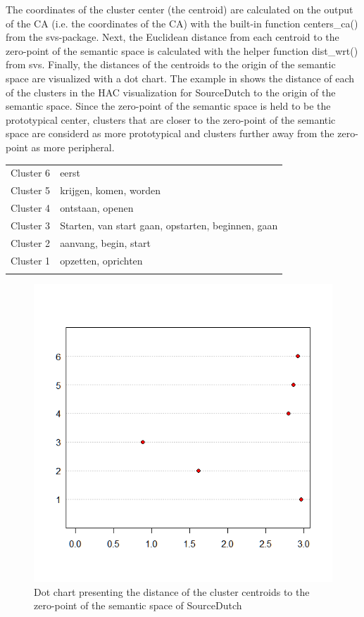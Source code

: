 The coordinates of the cluster center (the centroid) are calculated on the output of the CA (i.e. the coordinates of the CA) with the built-in function centers\_ca() from the svs{}-package. Next, the Euclidean distance from each centroid to the zero-point of the semantic space is calculated with the helper function dist\_wrt() from svs. Finally, the distances of the centroids to the origin of the semantic space are visualized with a dot chart. The example in  shows the distance of each of the clusters in the HAC visualization for SourceDutch to the origin of the semantic space. Since the zero-point of the semantic space is held to be the prototypical center, clusters that are closer to the zero-point of the semantic space are considerd as more prototypical and clusters further away from the zero-point as more peripheral. 


\begin{tabular}{ll}
\lsptoprule
Cluster 6 & eerst\\
Cluster 5 & krijgen, komen, worden\\
Cluster 4 & ontstaan, openen\\
Cluster 3 & Starten, van start gaan, opstarten, beginnen, gaan\\
Cluster 2 & aanvang, begin, start\\
Cluster 1 & opzetten, oprichten\\
\lspbottomrule
\end{tabular}

\begin{figure}
\includegraphics[height=.3\textheight]{figures/Vandevoorde2-img48.png}
\caption{\label{fig:key:48}  Dot chart presenting the distance of the cluster centroids to the zero-point of the semantic space of SourceDutch}
\end{figure}

